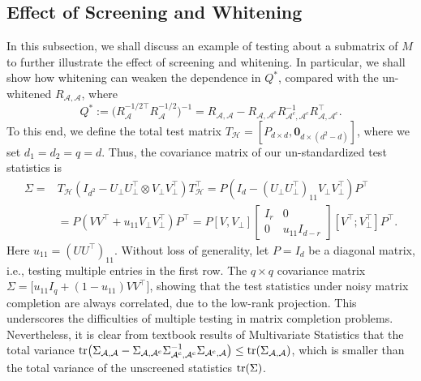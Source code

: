\documentclass[12pt]{article}
\def\calA{{\mathcal A}}
\def\calH{{\mathcal H}}
\theoremstyle{plain}
\begin{document}
\subsection{Effect of Screening and Whitening}
In this subsection, we shall discuss an example of testing about a submatrix of $M$ to further illustrate the effect of screening and whitening. In particular, we shall show how whitening can weaken the dependence in $Q^{\ast}$, compared with the un-whitened $R_{\calA,\calA}$, where
$$
Q^{\ast}:=\big(R_{\calA}^{-1/2\top} R_{\calA}^{-1/2}\big)^{-1}=R_{\calA,\calA} - R_{\calA,\calA^c}R_{\calA^c,\calA^c}^{-1}R_{\calA,\calA^c}^\top.
$$
To this end, we define the total test matrix $T_{\calH}=[P_{d\times d},\boldsymbol{0}_{d\times(d^2-d) }]$, where we set $d_1=d_2=q=d$. Thus, the covariance matrix of our un-standardized test statistics is
\begin{equation*}
\begin{aligned}
        \Sigma = & T_{\calH}\left(I_{d^2} -  U_\perp U_\perp^\top \otimes V_\perp V_\perp^\top\right)T_{\calH}^\top =  P\left(I_d - \left(U_\perp U_\perp^\top\right)_{11}V_\perp V_\perp^\top \right) P^\top \\ 
        & = P \left(VV^\top +u_{11}V_\perp V_\perp^\top \right)P^{\top} = P \left[V, V_\perp\right] \left[\begin{matrix} I_r & 0 \\0 & u_{11} I_{d-r}
        \end{matrix}\right] \left[V^\top; V_\perp^\top \right]P^\top.
\end{aligned}
\end{equation*}
Here $u_{11}= \left(UU^\top\right)_{11}$. Without loss of generality, let $P=I_d$ be a diagonal matrix, i.e., testing multiple entries in the first row. The $q\times q$ covariance matrix  $\Sigma=\big[u_{11}I_q+(1-u_{11})VV^{\top}\big]$, showing that the test statistics under noisy matrix completion are always correlated, due to the low-rank projection. This underscores the difficulties of multiple testing in matrix completion problems. Nevertheless, it is clear from textbook results of Multivariate Statistics that the total variance ${\rm tr}\big(\Sigma_{\calA,\calA}-\Sigma_{\calA,\calA^{\rm c}}\Sigma_{\calA^{\rm c},\calA^{\rm c}}^{-1}\Sigma_{\calA^{\rm c}, \calA}\big)\leq {\rm tr}(\Sigma_{\calA,\calA})$, which is smaller than the total variance of the unscreened statistics ${\rm tr}(\Sigma)$.
\end{document}
